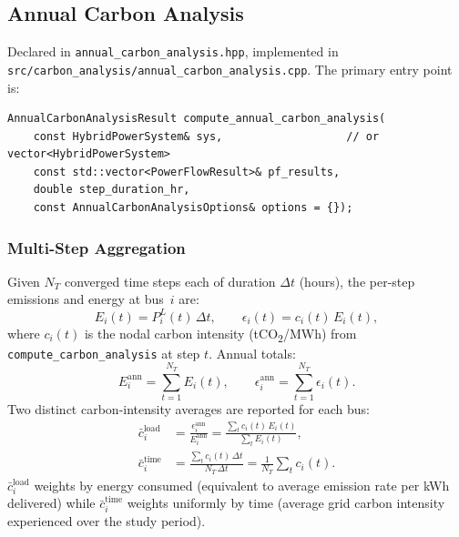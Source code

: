 \subsection{Annual Carbon Analysis}
\label{sec:annual-carbon}

Declared in \texttt{annual\_carbon\_analysis.hpp},
implemented in \texttt{src/carbon\_analysis/annual\_carbon\_analysis.cpp}.
The primary entry point is:
\begin{verbatim}
AnnualCarbonAnalysisResult compute_annual_carbon_analysis(
    const HybridPowerSystem& sys,                   // or vector<HybridPowerSystem>
    const std::vector<PowerFlowResult>& pf_results,
    double step_duration_hr,
    const AnnualCarbonAnalysisOptions& options = {});
\end{verbatim}

\subsubsection{Multi-Step Aggregation}

Given $N_T$ converged time steps each of duration $\Delta t$ (hours), the
per-step emissions and energy at bus~$i$ are:
\begin{equation}
  E_i(t) = P_i^L(t)\,\Delta t, \qquad
  \epsilon_i(t) = c_i(t)\,E_i(t),
\end{equation}
where $c_i(t)$ is the nodal carbon intensity (tCO\textsubscript{2}/MWh)
from \texttt{compute\_carbon\_analysis} at step $t$.  Annual totals:
\begin{equation}
  E_i^{\text{ann}} = \sum_{t=1}^{N_T} E_i(t), \qquad
  \epsilon_i^{\text{ann}} = \sum_{t=1}^{N_T} \epsilon_i(t).
\end{equation}
Two distinct carbon-intensity averages are reported for each bus:
\begin{align}
  \bar{c}_i^{\text{load}} &= \frac{\epsilon_i^{\text{ann}}}{E_i^{\text{ann}}}
    = \frac{\sum_t c_i(t)\,E_i(t)}{\sum_t E_i(t)},
    \label{eq:annual-load-weighted} \\[4pt]
  \bar{c}_i^{\text{time}} &= \frac{\sum_t c_i(t)\,\Delta t}{N_T\,\Delta t}
    = \frac{1}{N_T}\sum_t c_i(t).
    \label{eq:annual-time-weighted}
\end{align}
$\bar{c}_i^{\text{load}}$ weights by energy consumed (equivalent to
average emission rate per kWh delivered) while $\bar{c}_i^{\text{time}}$
weights uniformly by time (average grid carbon intensity experienced over
the study period).

